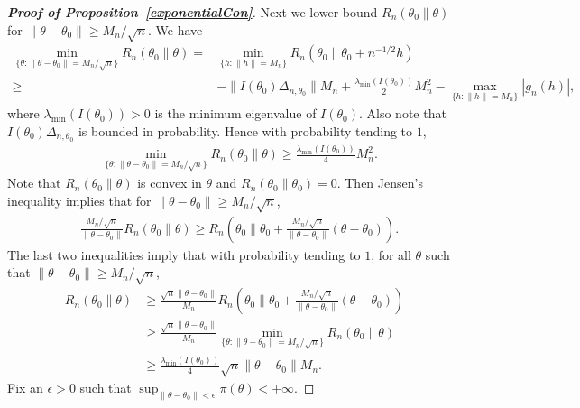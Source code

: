 \documentclass[11pt]{article}
\theoremstyle{plain}
\theoremstyle{definition}
\theoremstyle{remark}
\begin{document}
\begin{appendices}
\begin{proof}[\textbf{Proof of Proposition~\ref{exponentialCon}}]
Next we lower bound $
    R_n ( \theta_0 \| \theta  )
$ for $\|\theta-\theta_0\|\geq M_n/\sqrt{n}$.
    We have
    $$
    \begin{aligned}
        \min_{\{\theta:\|\theta-\theta_0\|=M_n/\sqrt{n}\}}
    R_n ( \theta_0 \| \theta  )
    =&
    \min_{\{h:\|h\|=M_n\}}
    R_n ( \theta_0 \| \theta_0+n^{-1/2}h )
        \\
        \geq &
        -\|I(\theta_0)\Delta_{n,\theta_0}\| M_n +\frac{\lambda_{\min}(I(\theta_0))}{2} M_n^2 -
        \max_{\{h:\|h\|=M_n\}}|g_n(h)|,
    \end{aligned}
    $$
    where $\lambda_{\min}( I(\theta_0) )>0$ is the minimum eigenvalue of $I(\theta_0)$.
    Also note that $I(\theta_0) \Delta_{n,\theta_0}$ is bounded in probability.
    Hence with probability tending to $1$,
    $$
    \begin{aligned}
        &\min_{\{\theta:\|\theta-\theta_0\|=M_n/\sqrt{n}\}}
        R_n ( \theta_0 \| \theta  )
        \geq 
        \frac{\lambda_{\min}(I(\theta_0))}{4}M_n^2.
    \end{aligned} 
    $$
    Note that $R_n(\theta_0 \| \theta)$ is convex in $\theta$ and $R_n (\theta_0 \| \theta_0) = 0 $.
    Then Jensen's inequality implies that for $\|\theta-\theta_0\|\geq M_n/\sqrt{n}$,
    \begin{equation*}
        \begin{split}
     &\frac{M_n/\sqrt{n}}{\|\theta-\theta_0\|}
     R_n(\theta_0 \| \theta)
     \geq
     R_n\left( \theta_0 \Big\| \theta_0+ \frac{M_n/\sqrt{n}}{\|\theta-\theta_0\|}(\theta-\theta_0)\right)
     .
        \end{split}
    \end{equation*}
    The last two inequalities imply that with probability tending to $1$, for all $\theta$ such that $\|\theta- \theta_0\|\geq M_n / \sqrt n$,
    $$
    \begin{aligned}
        R_n(\theta_0 \| \theta)
        &\geq
        \frac{\sqrt{n}\|\theta-\theta_0\|}{M_n}
      R_n\left(\theta_0\Big\|\theta_0+\frac{M_n/\sqrt{n}}{\|\theta-\theta_0\|}(\theta-\theta_0)\right)
        \\
        &\geq
        \frac{\sqrt{n}\|\theta-\theta_0\|}{M_n}
        \min_{\{\theta:\|\theta-\theta_0\|=M_n/\sqrt{n}\}}
        R_n ( \theta_0 \| \theta  )
        \\
        &\geq
        \frac{\lambda_{\min}(I(\theta_0))}{4}\sqrt{n}\|\theta-\theta_0\|
        M_n.
    \end{aligned}
    $$
    Fix an $\epsilon>0$ such that $\sup_{\|\theta-\theta_0\|< \epsilon}\pi(\theta) < +\infty $. 

\end{proof}
\end{appendices}
\end{document}
